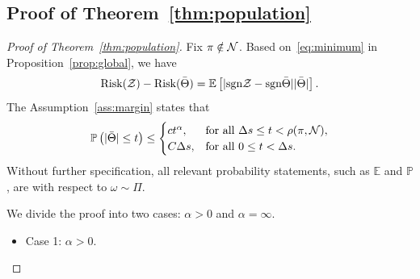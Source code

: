 \documentclass[11pt]{article}
\theoremstyle{plain}
\theoremstyle{definition}
\def\sign{\textup{sgn}}
\def\risk{\textup{Risk}}
\begin{document}
\subsection{Proof of Theorem~\ref{thm:population}}
\begin{proof}[Proof of Theorem~\ref{thm:population}]
Fix $\pi\notin\mathcal{N}$. Based on~\eqref{eq:minimum} in Proposition~\ref{prop:global}, we have
\begin{equation}\label{eq:population2}
\risk(\tZ)- \risk(\bar \Theta) = \mathbb{E}\left[|\sign \tZ-\sign\bar \Theta||\bar \Theta|\right].
\end{equation}
The Assumption~\ref{ass:margin} states that
\begin{align}\label{eq:ass}
\mathbb{P}\left(|\bar \Theta | \leq t\right) \leq 
\begin{cases}ct^\alpha, & \text{for all } \Delta s \leq t< \rho(\pi,\mathcal{N}),\\
C\Delta s, & \text{for all }0\leq t< \Delta s.
\end{cases}
\end{align}
Without further specification, all relevant probability statements, such as $\mathbb{E}$ and $\mathbb{P}$, are with respect to $\omega\sim \Pi$. 

We divide the proof into two cases: $\alpha >0$ and $\alpha = \infty$.
\begin{itemize}[leftmargin=*,topsep=0pt,itemsep=-1ex,partopsep=1ex,parsep=1ex]
\item Case 1: $\alpha>0$. 


\end{itemize}
\end{proof}
\end{document}
